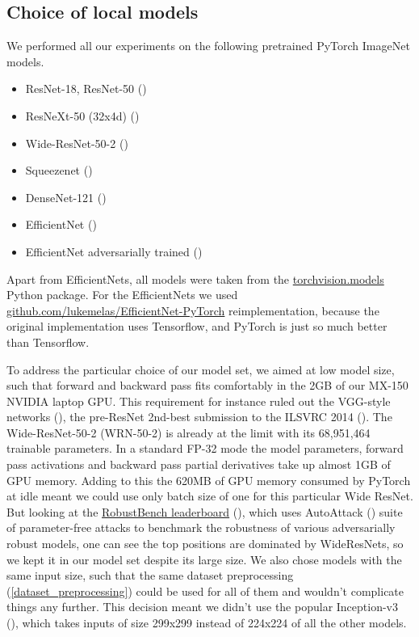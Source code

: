 \subsection{Choice of local models}
We performed all our experiments on the following pretrained PyTorch ImageNet models.

\begin{itemize}
    \item ResNet-18, ResNet-50 (\cite{he2015deep})
    \item ResNeXt-50 (32x4d) (\cite{xie2017aggregated})
    \item Wide-ResNet-50-2 (\cite{zagoruyko2017wide})
    \item Squeezenet (\cite{iandola2016squeezenet})
    \item DenseNet-121 (\cite{huang2018densely})
    \item EfficientNet (\cite{tan2020efficientnet})
    \item EfficientNet adversarially trained (\cite{tramer2020ensemble})
\end{itemize}

Apart from EfficientNets, all models were taken from the \href{https://pytorch.org/vision/stable/models.html}{torchvision.models} Python package. For the EfficientNets we used \href{https://github.com/lukemelas/EfficientNet-PyTorch}{github.com/lukemelas/EfficientNet-PyTorch} reimplementation, because the original implementation uses Tensorflow, and PyTorch is just so much better than Tensorflow.

To address the particular choice of our model set, we aimed at low model size, such that forward and backward pass fits comfortably in the 2GB of our MX-150 NVIDIA laptop GPU. This requirement for instance ruled out the VGG-style networks (\cite{simonyan2015deep}), the pre-ResNet 2nd-best submission to the ILSVRC 2014 (\cite{russakovsky2015imagenet}). The Wide-ResNet-50-2 (WRN-50-2) is already at the limit with its 68,951,464 trainable parameters. In a standard FP-32 mode the model parameters, forward pass activations and backward pass partial derivatives take up almost 1GB of GPU memory. Adding to this the 620MB of GPU memory consumed by PyTorch at idle meant we could use only batch size of one for this particular Wide ResNet. But looking at the \href{https://robustbench.github.io/}{RobustBench leaderboard} (\cite{croce2021robustbench}), which uses AutoAttack (\cite{croce2020reliable}) suite of parameter-free attacks to benchmark the robustness of various adversarially robust models, one can see the top positions are dominated by WideResNets, so we kept it in our model set despite its large size.
We also chose models with the same input size, such that the same dataset preprocessing (\ref{dataset_preprocessing}) could be used for all of them and wouldn't complicate things any further. This decision meant we didn't use the popular Inception-v3 (\cite{szegedy2015rethinking}), which takes inputs of size 299x299 instead of 224x224 of all the other models.

